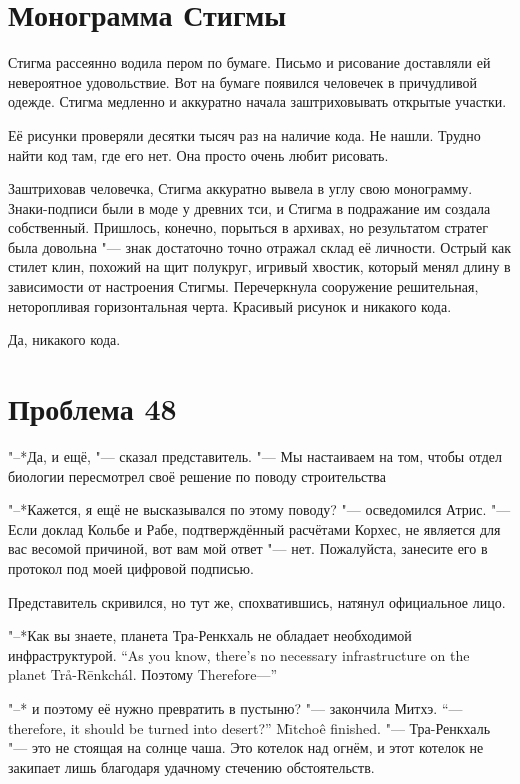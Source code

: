 \section{Монограмма Стигмы}

Стигма рассеянно водила пером по бумаге.
Письмо и рисование доставляли ей невероятное удовольствие.
Вот на бумаге появился человечек в причудливой одежде.
Стигма медленно и аккуратно начала заштриховывать открытые участки.

Её рисунки проверяли десятки тысяч раз на наличие кода.
Не нашли.
Трудно найти код там, где его нет.
Она просто очень любит рисовать.

Заштриховав человечка, Стигма аккуратно вывела в углу свою монограмму.
Знаки-подписи были в моде у древних тси, и Стигма в подражание им создала собственный.
Пришлось, конечно, порыться в архивах, но результатом стратег была довольна "--- знак достаточно точно отражал склад её личности.
Острый как стилет клин, похожий на щит полукруг, игривый хвостик, который менял длину в зависимости от настроения Стигмы.
Перечеркнула сооружение решительная, неторопливая горизонтальная черта.
Красивый рисунок и никакого кода.

Да, никакого кода.

\section{Проблема 48}

"--*Да, и ещё, "--- сказал представитель.
"--- Мы настаиваем на том, чтобы отдел биологии пересмотрел своё решение по поводу строительства\ldotst

"--*Кажется, я ещё не высказывался по этому поводу? "--- осведомился Атрис.
"--- Если доклад Кольбе и Рабе, подтверждённый расчётами Корхес, не является для вас весомой причиной, вот вам мой ответ "--- нет.
Пожалуйста, занесите его в протокол под моей цифровой подписью.

Представитель скривился, но тут же, спохватившись, натянул официальное лицо.

{"--*Как вы знаете, планета Тра-Ренкхаль не обладает необходимой инфраструктурой.}
{``As you know, there's no necessary infrastructure on the planet Tr\r{a}-R\={e}nkch\'{a}l.}
{Поэтому\ldotst}
{Therefore---''}

{"--* \ldotst и поэтому её нужно превратить в пустыню? "--- закончила Митхэ.}
{``---therefore, it should be turned into desert?'' M\={\i}tcho\^{e} finished.}
"--- Тра-Ренкхаль "--- это не стоящая на солнце чаша.
Это котелок над огнём, и этот котелок не закипает лишь благодаря удачному стечению обстоятельств.

